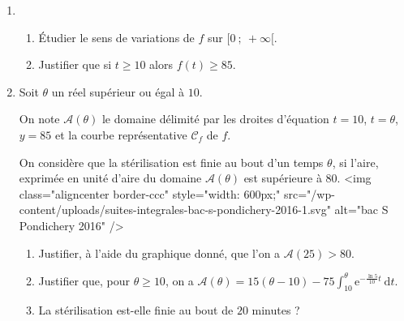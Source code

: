 \begin{enumerate}
     \item
     \begin{enumerate}
          \item
          Étudier le sens de variations de $f$ sur $[0~;~+ \infty[$.
          \item
          Justifier que si $t \geqslant 10$ alors $f(t) \geqslant 85$.
     \end{enumerate}
     \item
     Soit $\theta$ un réel supérieur ou égal à $10$.
     \par
     On note $\mathcal{A}(\theta)$ le domaine délimité par les droites d'équation $t = 10$, $t = \theta$, $y = 85$ et la courbe représentative $\mathscr{C}_f$ de $f$.
     \par
     On considère que la stérilisation est finie au bout d'un temps $\theta$, si l'aire, exprimée en unité d'aire du domaine $\mathcal{A}(\theta)$ est supérieure à $80$.
     <img class="aligncenter border-ccc" style="width: 600px;" src="/wp-content/uploads/suites-integrales-bac-s-pondichery-2016-1.svg" alt="bac S Pondichery 2016" />
     \begin{enumerate}
          \item
          Justifier, à l'aide du graphique donné, que l'on a $\mathcal{A}(25) > 80$.
          \item
          Justifier que, pour $\theta \geqslant 10$, on a $\mathcal{A}(\theta) = 15(\theta-10)-75 \int_{10}^{\theta} \text{e}^{- \frac{\ln 5}{10}t}\:\text{d}t$.
          \item
          La stérilisation est-elle finie au bout de $20$ minutes ?
     \end{enumerate}
\end{enumerate}
